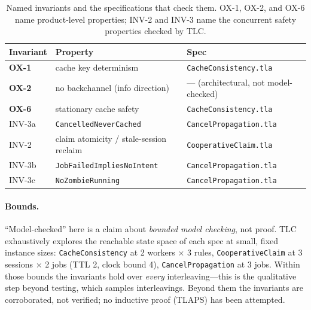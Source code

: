 \documentclass[12pt,a4paper]{article}
\newcommand{\code}[1]{{\texttt{\small\color{inlinecode}#1}}}
\begin{document}
\begin{table}[htbp]
\centering\small
\begin{tabular}{@{}lll@{}}
\toprule
\textbf{Invariant} & \textbf{Property} & \textbf{Spec} \\
\midrule
\textbf{OX-1} & cache key determinism                          & \code{Cache\allowbreak Consistency.tla} \\
\textbf{OX-2} & no backchannel (info direction)                & --- (architectural, not model-checked) \\
\textbf{OX-6} & stationary cache safety                        & \code{Cache\allowbreak Consistency.tla} \\
INV-3a        & \code{CancelledNeverCached}                     & \code{Cancel\allowbreak Propagation.tla} \\
INV-2         & claim atomicity / stale-session reclaim         & \code{Cooperative\allowbreak Claim.tla} \\
INV-3b        & \code{JobFailedImpliesNoIntent}                 & \code{Cancel\allowbreak Propagation.tla} \\
INV-3c        & \code{No\allowbreak Zombie\allowbreak Running}                  & \code{Cancel\allowbreak Propagation.tla} \\
\bottomrule
\end{tabular}
\caption{Named invariants and the specifications that check them.
  OX-1, OX-2, and OX-6 name product-level properties; INV-2 and
  INV-3 name the concurrent safety properties checked by TLC.}
\label{tab:named-invariants}
\end{table}

\paragraph{Bounds.}
``Model-checked'' here is a claim about \emph{bounded
model checking}, not proof. TLC exhaustively explores the reachable
state space of each spec at small, fixed instance sizes:
\code{Cache\allowbreak Consistency} at 2 workers $\times$ 3 rules,
\code{Cooperative\allowbreak Claim} at 3 sessions $\times$ 2 jobs (TTL 2, clock
bound 4), \code{Cancel\allowbreak Propagation} at 3 jobs. Within those bounds
the invariants hold over \emph{every} interleaving---this is the
qualitative step beyond testing, which samples interleavings. Beyond
them the invariants are corroborated, not verified; no inductive proof
(TLAPS) has been attempted.
\end{document}
